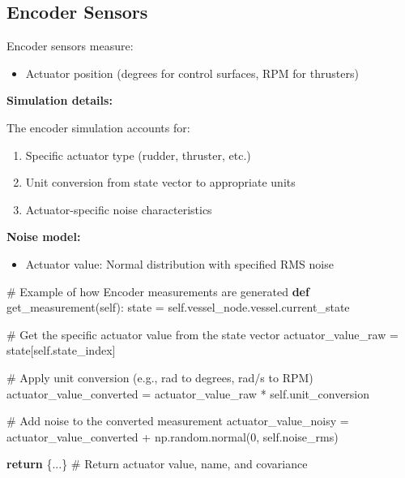 \documentclass[
  letterpaper,
  DIV=11,
  numbers=noendperiod]{scrreprt}
\newenvironment{Shaded}{\begin{snugshade}}{\end{snugshade}}
\newcommand{\CommentTok}[1]{\textcolor[rgb]{0.37,0.37,0.37}{#1}}
\newcommand{\ControlFlowTok}[1]{\textcolor[rgb]{0.00,0.23,0.31}{\textbf{#1}}}
\newcommand{\DecValTok}[1]{\textcolor[rgb]{0.68,0.00,0.00}{#1}}
\newcommand{\KeywordTok}[1]{\textcolor[rgb]{0.00,0.23,0.31}{\textbf{#1}}}
\newcommand{\NormalTok}[1]{\textcolor[rgb]{0.00,0.23,0.31}{#1}}
\newcommand{\OperatorTok}[1]{\textcolor[rgb]{0.37,0.37,0.37}{#1}}
\newcommand{\VariableTok}[1]{\textcolor[rgb]{0.07,0.07,0.07}{#1}}
\providecommand{\tightlist}{%
  \setlength{\itemsep}{0pt}\setlength{\parskip}{0pt}}\usepackage{longtable,booktabs,array}
\begin{document}
\subsection*{Encoder Sensors}\label{encoder-sensors}

Encoder sensors measure:

\begin{itemize}
\tightlist
\item
  Actuator position (degrees for control surfaces, RPM for thrusters)
\end{itemize}

\textbf{Simulation details:}

The encoder simulation accounts for:

\begin{enumerate}
\def\labelenumi{\arabic{enumi}.}
\tightlist
\item
  Specific actuator type (rudder, thruster, etc.)
\item
  Unit conversion from state vector to appropriate units
\item
  Actuator-specific noise characteristics
\end{enumerate}

\textbf{Noise model:}

\begin{itemize}
\tightlist
\item
  Actuator value: Normal distribution with specified RMS noise
\end{itemize}

\begin{Shaded}
\begin{Highlighting}[]
\CommentTok{\# Example of how Encoder measurements are generated}
\KeywordTok{def}\NormalTok{ get\_measurement(}\VariableTok{self}\NormalTok{):}
\NormalTok{    state }\OperatorTok{=} \VariableTok{self}\NormalTok{.vessel\_node.vessel.current\_state}
    
    \CommentTok{\# Get the specific actuator value from the state vector}
\NormalTok{    actuator\_value\_raw }\OperatorTok{=}\NormalTok{ state[}\VariableTok{self}\NormalTok{.state\_index]}
    
    \CommentTok{\# Apply unit conversion (e.g., rad to degrees, rad/s to RPM)}
\NormalTok{    actuator\_value\_converted }\OperatorTok{=}\NormalTok{ actuator\_value\_raw }\OperatorTok{*} \VariableTok{self}\NormalTok{.unit\_conversion}
    
    \CommentTok{\# Add noise to the converted measurement}
\NormalTok{    actuator\_value\_noisy }\OperatorTok{=}\NormalTok{ actuator\_value\_converted }\OperatorTok{+}\NormalTok{ np.random.normal(}\DecValTok{0}\NormalTok{, }\VariableTok{self}\NormalTok{.noise\_rms)}

    \ControlFlowTok{return}\NormalTok{ \{...\}  }\CommentTok{\# Return actuator value, name, and covariance}
\end{Highlighting}
\end{Shaded}
\end{document}
